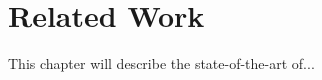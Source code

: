 \chapter{Related Work}

This chapter will describe \cite{merity2017regularizing} the state-of-the-art \cite{grave2016improving} of... 
